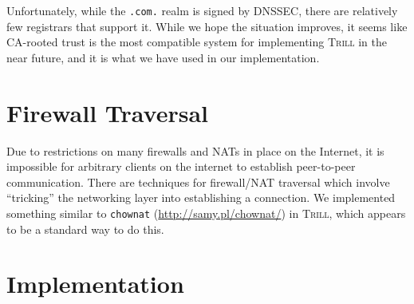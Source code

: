 \documentclass[12pt]{article}
\newcommand{\Trill}{\textsc{Trill}\xspace}
\begin{document}
Unfortunately, while the \verb`.com.` realm is signed by DNSSEC, there are
relatively few registrars that support it. While we hope the situation improves,
it seems like CA-rooted trust is the most compatible system for implementing
\Trill in the near future, and it is what we have used in our implementation.

\section*{Firewall Traversal}
Due to restrictions on many firewalls and NATs in place on the Internet, it is
impossible for arbitrary clients on the internet to establish peer-to-peer
communication. There are techniques for firewall/NAT traversal which involve
``tricking'' the networking layer into establishing a connection. We implemented
something similar to \texttt{chownat} (\url{http://samy.pl/chownat/}) in \Trill,
which appears to be a standard way to do this.

\section*{Implementation}
\end{document}
